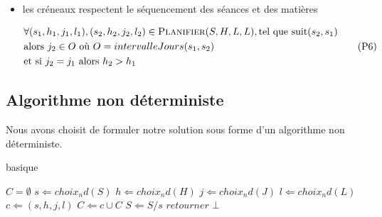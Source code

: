 \begin{itemize}
    \item les créneaux respectent le séquencement des séances et des matières

        \begin{equation}\label{eqn:p6}
            \begin{split}
                & \forall(s_1, h_1, j_1, l_1), (s_2, h_2, j_2, l_2)
                \in \textsc{Planifier}(S, H, L, L),
                \text{tel que} \  \text{suit}(s_2, s_1)\\
                & \text{alors} \  j_2 \in O
                \  \text{où} \  O = intervalleJours(s_1, s_2)\\
                & \text{et si} \  j_2 = j_1 \  \text{alors} \  h_2 > h_1
            \end{split}
            \tag{P6}
        \end{equation}

\end{itemize}

\subsection{Algorithme non déterministe}

Nous avons choisit de formuler notre solution sous forme d'un algorithme non déterministe.

\begin{algorithm}                    
\caption{basique}      
\label{alg1}                           
\begin{algorithmic}                
    \REQUIRE $C = \emptyset$
        \STATE $s \Leftarrow choix_nd(S)$
        \STATE $h \Leftarrow choix_nd(H)$
        \STATE $j \Leftarrow choix_nd(J)$
        \STATE $l \Leftarrow choix_nd(L)$
        \STATE $c \Leftarrow (s, h, j, l)$
            \STATE $C \Leftarrow c \cup C$
            \STATE $S \Leftarrow S / s$
        \ELSE
            \STATE $retourner \perp$
        \ENDIF
    \ENDWHILE
\end{algorithmic}
\end{algorithm}
